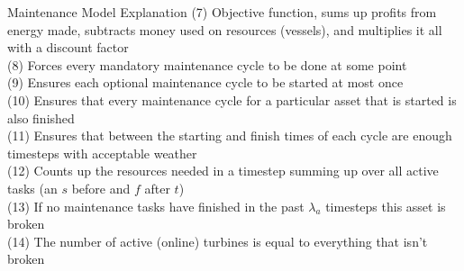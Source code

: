 \documentclass{beamer}
\begin{document}
\begin{frame}{Maintenance  Model Explanation}
\footnotesize
(7) Objective function, sums up profits from energy made, subtracts money used on resources (vessels), and multiplies it all with a discount factor	\\
(8) Forces every mandatory maintenance cycle to be done at some point	\\
(9) Ensures each optional maintenance cycle to be started at most once	\\
(10) Ensures that every maintenance cycle for a particular asset that is started is also finished	\\
(11) Ensures that between the starting and finish times of each cycle are enough timesteps with acceptable weather	\\
(12) Counts up the resources needed in a timestep summing up over all active tasks (an $s$ before and $f$ after $t$)	\\
(13) If no maintenance tasks have finished in the past $\lambda_a$ timesteps this asset is broken	\\
(14) The number of active (online) turbines is equal to everything that isn't broken
\end{frame}
\end{document}

